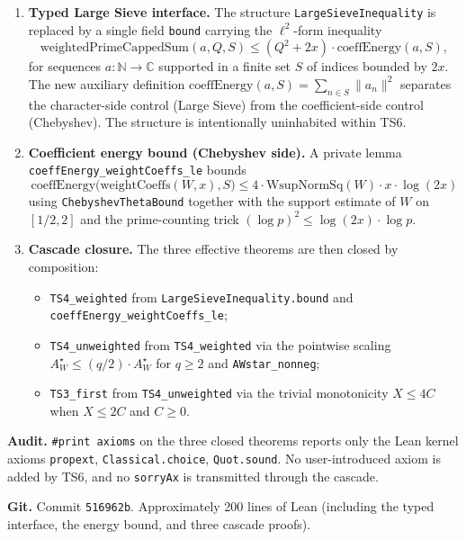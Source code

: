 \documentclass[11pt,a4paper]{article}
\theoremstyle{definition}
\newcommand{\AWs}{A_W^{\star}}
\begin{document}
\begin{enumerate}
\item \textbf{Typed Large Sieve interface.} The structure \verb|LargeSieveInequality| is replaced by a single field \verb|bound| carrying the $\ell^2$-form inequality
\[
  \mathrm{weightedPrimeCappedSum}(a, Q, S) \leq (Q^2 + 2x) \cdot \mathrm{coeffEnergy}(a, S),
\]
for sequences $a : \mathbb{N} \to \mathbb{C}$ supported in a finite set $S$ of indices bounded by $2x$. The new auxiliary definition $\mathrm{coeffEnergy}(a, S) = \sum_{n \in S} \|a_n\|^2$ separates the character-side control (Large Sieve) from the coefficient-side control (Chebyshev). The structure is intentionally uninhabited within TS6.

\item \textbf{Coefficient energy bound (Chebyshev side).} A private lemma \verb|coeffEnergy_weightCoeffs_le| bounds
\[
  \mathrm{coeffEnergy}\bigl(\mathrm{weightCoeffs}(W, x), S\bigr) \leq 4 \cdot \mathrm{WsupNormSq}(W) \cdot x \cdot \log(2x)
\]
using \verb|ChebyshevThetaBound| together with the support estimate of $W$ on $[1/2, 2]$ and the prime-counting trick $(\log p)^2 \leq \log(2x) \cdot \log p$.

\item \textbf{Cascade closure.} The three effective theorems are then closed by composition:
  \begin{itemize}[noitemsep]
  \item \verb|TS4_weighted| from \verb|LargeSieveInequality.bound| and \verb|coeffEnergy_weightCoeffs_le|;
  \item \verb|TS4_unweighted| from \verb|TS4_weighted| via the pointwise scaling $\AWs \leq (q/2) \cdot \AWs$ for $q \geq 2$ and \verb|AWstar_nonneg|;
  \item \verb|TS3_first| from \verb|TS4_unweighted| via the trivial monotonicity $X \leq 4C$ when $X \leq 2C$ and $C \geq 0$.
  \end{itemize}
\end{enumerate}

\textbf{Audit.} \verb|#print axioms| on the three closed theorems reports only the Lean kernel axioms \verb|propext|, \verb|Classical.choice|, \verb|Quot.sound|. No user-introduced axiom is added by TS6, and no \verb|sorryAx| is transmitted through the cascade.

\textbf{Git.} Commit \verb|516962b|. Approximately 200 lines of Lean (including the typed interface, the energy bound, and three cascade proofs).

\end{document}
